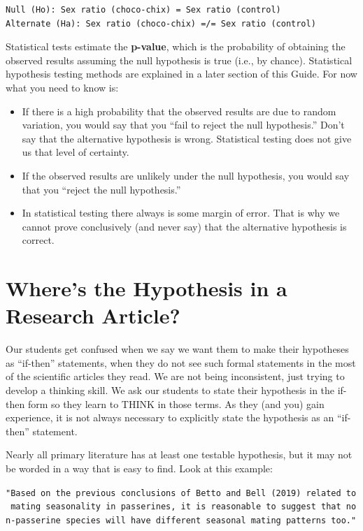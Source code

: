 \documentclass[
]{book}
\providecommand{\tightlist}{%
  \setlength{\itemsep}{0pt}\setlength{\parskip}{0pt}}
\begin{document}
\begin{verbatim}
Null (Ho): Sex ratio (choco-chix) = Sex ratio (control)
Alternate (Ha): Sex ratio (choco-chix) =/= Sex ratio (control)
\end{verbatim}

Statistical tests estimate the \textbf{p-value}, which is the probability of obtaining the observed results assuming the null hypothesis is true (i.e., by chance). Statistical hypothesis testing methods are explained in a later section of this Guide. For now what you need to know is:

\begin{itemize}
\tightlist
\item
  If there is a high probability that the observed results are due to random variation, you would say that you ``fail to reject the null hypothesis.'' Don't say that the alternative hypothesis is wrong. Statistical testing does not give us that level of certainty.
\item
  If the observed results are unlikely under the null hypothesis, you would say that you ``reject the null hypothesis.''
\item
  In statistical testing there always is some margin of error. That is why we cannot prove conclusively (and never say) that the alternative hypothesis is correct.
\end{itemize}

\hypertarget{wheres-the-hypothesis-in-a-research-article}{%
\section{Where's the Hypothesis in a Research Article?}\label{wheres-the-hypothesis-in-a-research-article}}

Our students get confused when we say we want them to make their hypotheses as ``if-then'' statements, when they do not see such formal statements in the most of the scientific articles they read. We are not being inconsistent, just trying to develop a thinking skill. We ask our students to state their hypothesis in the if-then form so they learn to THINK in those terms. As they (and you) gain experience, it is not always necessary to explicitly state the hypothesis as an ``if-then'' statement.

Nearly all primary literature has at least one testable hypothesis, but it may not be worded in a way that is easy to find. Look at this example:

\texttt{"Based\ on\ the\ previous\ conclusions\ of\ Betto\ and\ Bell\ (2019)\ related\ to\ mating\ seasonality\ in\ passerines,\ it\ is\ reasonable\ to\ suggest\ that\ non-passerine\ species\ will\ have\ different\ seasonal\ mating\ patterns\ too."}
\end{document}
